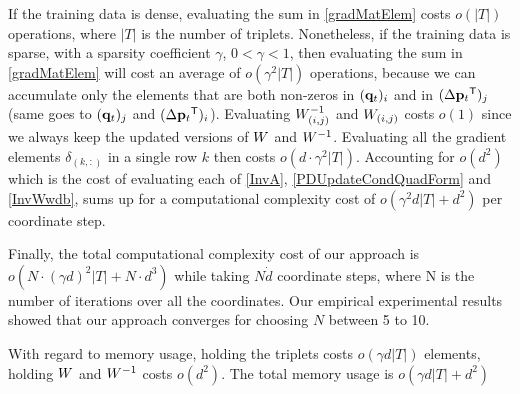 \documentclass{article}
\begin{document}
If the training data is dense, evaluating the sum in
\eqref{gradMatElem} costs $o(|T|)$ operations, where $|T|$ is the
number of triplets. Nonetheless, if the training data is sparse, with
a sparsity coefficient $\gamma$, $ 0< \gamma <1 $, then evaluating the
sum in \eqref{gradMatElem} will cost an average of $o(\gamma^2 |T|)$
operations, because we can accumulate only the elements that are both
non-zeros in $({\mathbf{q}}_{t})_i$ and in $(\Delta{\mathbf{p}}_{t}{}^\mathsf{T})_j $ (same
goes to $({\mathbf{q}}_{t})_j$ and $(\Delta{\mathbf{p}}_{t}{}^\mathsf{T})_i$). Evaluating
${W}^{-1}_{(i,j)}$ and ${W}_{(i,j)}$ costs $o(1)$ since we always keep
the updated versions of ${W}$ and ${W}^{-1}$. Evaluating all the
gradient elements $\delta_{(k,:)}$ in a single row $k$ then costs
$o(d\cdot \gamma^2 |T|)$. Accounting for $o(d^2)$ which is the cost of
evaluating each of \eqref{InvA}, \eqref{PDUpdateCondQuadForm} and
\eqref{InvWwdb}, sums up for a computational complexity cost of
$o(\gamma^2 d |T| + d^2)$ per coordinate step.

Finally, the total computational complexity cost of our approach is
$o(N \cdot (\gamma d)^2 |T| + N \cdot d^3)$ while taking $N \dot d$
coordinate steps, where N is the number of iterations over all the
coordinates. Our empirical experimental results showed that our
approach converges for choosing $N$ between 5 to 10.

With regard to memory usage, holding the triplets costs $o(\gamma d
|T|)$ elements, holding ${W}$ and ${W}^{-1}$ costs $o(d^2)$. The total
memory usage is $o(\gamma d |T| + d^2)$
\end{document}
